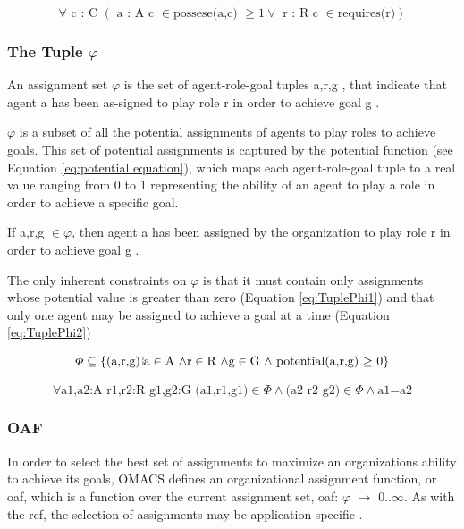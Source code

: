 \begin{equation}
\forall\textrm{ c : C }\left(\textrm{ a : A c }\in\textrm{possese(a,c) }\geq1\lor\textrm{ r : R c }\in\textrm{requires(r)}\right)\label{eq : capabilities}
\end{equation}


\subsubsection{The Tuple $\varphi$} 
An assignment set $\varphi$ is the set of agent-role-goal tuples \textlangle{} a,r,g \textrangle{}, that indicate that agent a has been as-signed to play role r in order to achieve goal g \cite{omacs4}.

$\varphi$ is a subset of all the potential assignments of agents to play roles to achieve goals. This set of potential assignments is captured by the potential function (see Equation \ref{eq:potential equation}), which maps each agent-role-goal tuple to a real value ranging from 0 to 1 representing the ability of an agent to play a role in order to achieve a specific goal.
	 
If \textlangle a,r,g \textrangle $\in \varphi$, then agent a has been assigned by the organization to play role r in order to achieve goal g \cite{omacs4}.

The only inherent constraints on $\varphi$ is that it must contain only assignments whose potential value is greater than zero (Equation \ref{eq:TuplePhi1}) and that only one agent may be assigned to achieve a goal at a time (Equation \ref{eq:TuplePhi2})		


\begin{equation}
\varPhi\subseteq\left\{ \left(\textrm{a,r,g}\right)\brokenvert\textrm{a}\in\textrm{A \ensuremath{\land}}\textrm{r}\in\textrm{R \ensuremath{\land\textrm{g}\in\textrm{G \ensuremath{\land} \textrm{potential(a,r,g) \ensuremath{\ge} 0}}}}\right\} 
\label{eq:TuplePhi1}
\end{equation}

\begin{equation}
\forall\textrm{a1,a2:A r1,r2:R g1,g2:G (a1,r1,g1)}\in\varPhi\land\textrm{(a2 r2 g2)}\in\varPhi\land\textrm{a1=a2}\label{eq:TuplePhi2}
\end{equation}

 		
 

\subsubsection{OAF}
In order to select the best set of assignments to maximize an organizations ability to achieve its goals, OMACS defines an organizational assignment function, or oaf, which is a function over the current assignment set, oaf: $\varphi$ $\rightarrow$ 0..$\infty$. As with the rcf, the selection of assignments may be application specific \cite{omacs4}.
	
